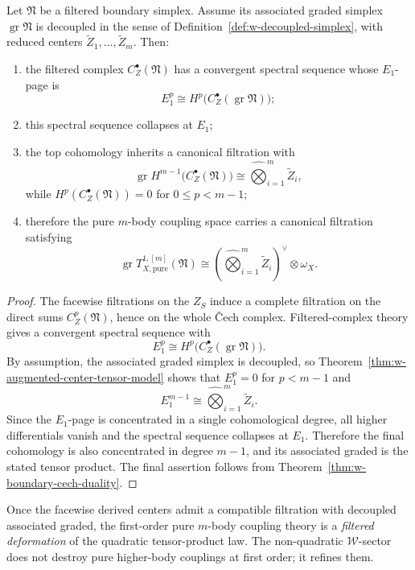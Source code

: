 \begin{theorem}
\label{thm:w-filtered-stability-pure-mbody}
Let $\mathfrak N$ be a filtered boundary simplex. Assume its associated graded simplex
$\operatorname{gr}\mathfrak N$ is decoupled in the sense of Definition~\ref{def:w-decoupled-simplex}, with reduced
centers $\widetilde Z_1,\dots,\widetilde Z_m$. Then:
\begin{enumerate}[label=(\alph*)]
\item the filtered complex $C_Z^\bullet(\mathfrak N)$ has a convergent spectral sequence whose $E_1$-page is
\[
E_1^p \cong H^p\bigl(C_Z^\bullet(\operatorname{gr}\mathfrak N)\bigr);
\]
\item this spectral sequence collapses at $E_1$;
\item the top cohomology inherits a canonical filtration with
\[
\operatorname{gr}H^{m-1}\bigl(C_Z^\bullet(\mathfrak N)\bigr)
\cong
\widehat\bigotimes_{i=1}^m \widetilde Z_i,
\]
while $H^p(C_Z^\bullet(\mathfrak N))=0$ for $0\le p<m-1$;
\item therefore the pure $m$-body coupling space carries a canonical filtration satisfying
\[
\operatorname{gr}T^{1,[m]}_{X,\mathrm{pure}}(\mathfrak N)
\cong
\left(\widehat\bigotimes_{i=1}^m \widetilde Z_i\right)^\vee\otimes \omega_X.
\]
\end{enumerate}
\end{theorem}

\begin{proof}
The facewise filtrations on the $Z_S$ induce a complete filtration on the direct sums
$C_Z^p(\mathfrak N)$, hence on the whole \v{C}ech complex. Filtered-complex theory gives a convergent
spectral sequence with
\[
E_1^p\cong H^p\bigl(C_Z^\bullet(\operatorname{gr}\mathfrak N)\bigr).
\]
By assumption, the associated graded simplex is decoupled, so Theorem~\ref{thm:w-augmented-center-tensor-model}
shows that $E_1^p=0$ for $p<m-1$ and
\[
E_1^{m-1}\cong \widehat\bigotimes_{i=1}^m \widetilde Z_i.
\]
Since the $E_1$-page is concentrated in a single cohomological degree, all higher differentials vanish and the
spectral sequence collapses at $E_1$. Therefore the final cohomology is also concentrated in degree $m-1$, and its
associated graded is the stated tensor product. The final assertion follows from Theorem~\ref{thm:w-boundary-cech-duality}.
\end{proof}

\begin{remark}
\label{rem:w-filtered-stability-meaning}
Once the facewise derived centers admit a compatible filtration with decoupled associated
graded, the first-order pure $m$-body coupling theory is a \emph{filtered deformation} of the quadratic tensor-product law.
The non-quadratic $\mathcal W$-sector does not destroy pure higher-body couplings at first order; it refines them.
\end{remark}

